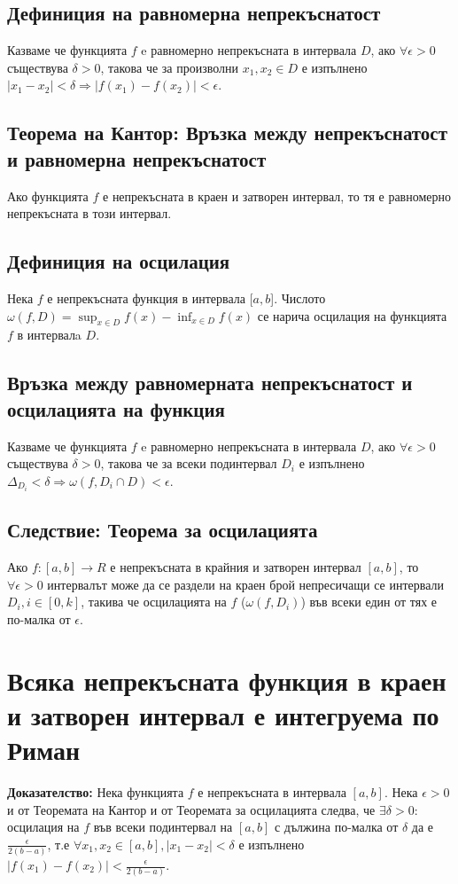 \documentclass[fleqn,12pt]{article}
\begin{document}
\subsection{Дефиниция на равномерна непрекъснатост}
Казваме че функцията $f$ e равномерно непрекъсната в интервала $D$, ако $\forall \epsilon>0$ съществува $\delta>0$,
такова че за произволни $x_1,x_2 \in D$ е изпълнено $|x_1 - x_2|<\delta \Rightarrow |f(x_1)-f(x_2)|<\epsilon$.

\subsection{Теорема на Кантор: Връзка между непрекъснатост и равномерна непрекъснатост}
Ако функцията $f$ е непрекъсната в краен и затворен интервал, то тя е равномерно непрекъсната в този интервал.

\subsection{Дефиниция на осцилация}
Нека $f$ е непрекъсната функция в интервала $[a,b$]. Числото $\omega(f,D) = \sup_{x \in D} f(x) - \inf_{x \in D} f(x)$ се нарича осцилация на функцията $f$ в интервалa $D$.

\subsection{Връзка между равномерната непрекъснатост и осцилацията на функция}
Казваме че функцията $f$ e равномерно непрекъсната в интервала $D$, ако $\forall \epsilon>0$ съществува $\delta>0$, такова че 
за всеки подинтервал $D_i$ е изпълнено $\Delta_{D_i} < \delta \Rightarrow \omega(f,D_i \cap D) < \epsilon$.

\subsection{Следствие: Теорема за осцилацията}
Ако $f:[a,b] \rightarrow R$ е непрекъсната в крайния и затворен интервал $[a,b]$, то $\forall \epsilon>0$ интервалът може да се раздели на краен брой непресичащи се интервали $D_i, i\in[0,k]$,
такива че осцилацията на $f$ ($\omega(f,D_i)$) във всеки един от тях е по-малка от $\epsilon$. 


\section{Всяка непрекъсната функция в краен и затворен интервал е интегруема по Риман}
\textbf{Доказателство: } Нека функцията $f$ е непрекъсната в интервала $[a,b]$. Нека $\epsilon > 0$ и от Теоремата на Кантор и от Теоремата за осцилацията следва, че $\exists \delta>0 :$ осцилация на  $f$ във всеки подинтервал
на $[a,b]$ с дължина по-малка от $\delta$ да е $\frac{\epsilon}{2(b-a)}$, т.е $\forall x_1,x_2 \in [a,b] , |x_1 - x_2| < \delta$ е изпълнено $|f(x_1)-f(x_2)| < \frac{\epsilon}{2(b-a)}$.
\end{document}

